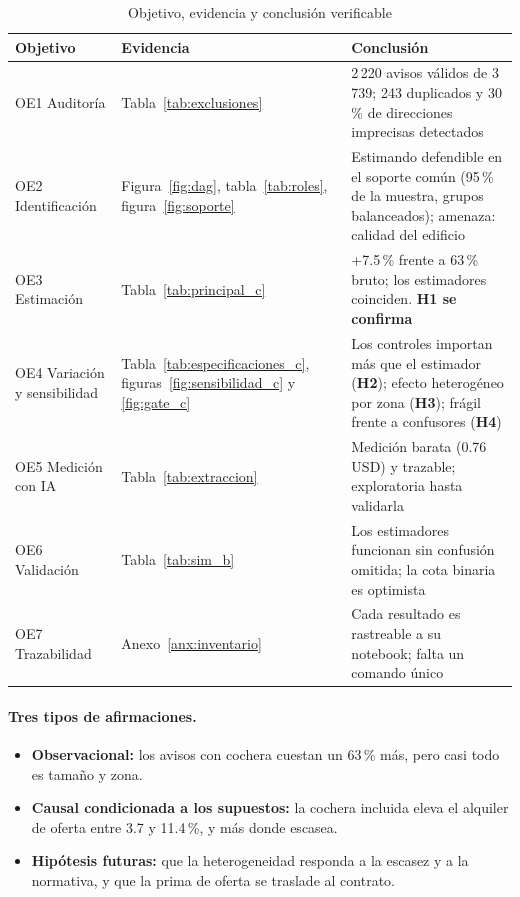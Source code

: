 \begin{table}[H]
\centering\small
\caption{Objetivo, evidencia y conclusión verificable}\label{tab:correspondencia}
\begin{tabularx}{\textwidth}{>{\raggedright\arraybackslash}p{2.4cm}>{\raggedright\arraybackslash}p{3.2cm}X}
\toprule
Objetivo & Evidencia & Conclusión \\
\midrule
OE1 Auditoría & Tabla~\ref{tab:exclusiones} & 2\,220 avisos válidos de 3\,739; 243 duplicados y 30\,\% de direcciones imprecisas detectados \\
OE2 Identificación & Figura~\ref{fig:dag}, tabla~\ref{tab:roles}, figura~\ref{fig:soporte} & Estimando defendible en el soporte común (95\,\% de la muestra, grupos balanceados); amenaza: calidad del edificio \\
OE3 Estimación & Tabla~\ref{tab:principal_c} & +7.5\,\% frente a 63\,\% bruto; los estimadores coinciden. \textbf{H1 se confirma} \\
OE4 Variación y sensibilidad & Tabla~\ref{tab:especificaciones_c}, figuras~\ref{fig:sensibilidad_c} y \ref{fig:gate_c} & Los controles importan más que el estimador (\textbf{H2}); efecto heterogéneo por zona (\textbf{H3}); frágil frente a confusores (\textbf{H4}) \\
OE5 Medición con IA & Tabla~\ref{tab:extraccion} & Medición barata (0.76 USD) y trazable; exploratoria hasta validarla \\
OE6 Validación & Tabla~\ref{tab:sim_b} & Los estimadores funcionan sin confusión omitida; la cota binaria es optimista \\
OE7 Trazabilidad & Anexo~\ref{anx:inventario} & Cada resultado es rastreable a su notebook; falta un comando único \\
\bottomrule
\end{tabularx}
\end{table}

\paragraph{Tres tipos de afirmaciones.}
\begin{itemize}[itemsep=1pt]
\item \textbf{Observacional:} los avisos con cochera cuestan un 63\,\% más, pero casi todo es tamaño y zona.
\item \textbf{Causal condicionada a los supuestos:} la cochera incluida eleva el alquiler de oferta entre 3.7 y 11.4\,\%, y más donde escasea.
\item \textbf{Hipótesis futuras:} que la heterogeneidad responda a la escasez y a la normativa, y que la prima de oferta se traslade al contrato.
\end{itemize}

